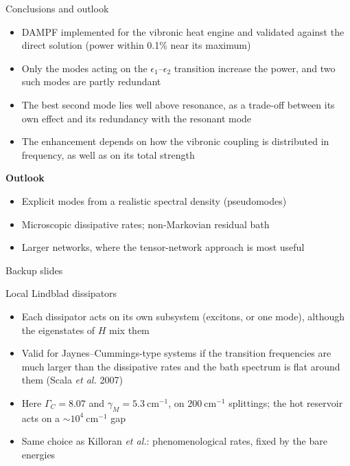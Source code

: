 \documentclass[aspectratio=169,11pt]{beamer}
\begin{document}
\begin{frame}{Conclusions and outlook}
  \begin{itemize}\setlength\itemsep{0.6em}
    \item DAMPF implemented for the vibronic heat engine and validated against the direct solution (power within 0.1\% near its maximum)
    \item Only the modes acting on the $\epsilon_1$--$\epsilon_2$ transition increase the power, and two such modes are partly redundant
    \item The best second mode lies well above resonance, as a trade-off between its own effect and its redundancy with the resonant mode
    \item The enhancement depends on how the vibronic coupling is distributed in frequency, as well as on its total strength
  \end{itemize}
  \vspace{0.6em}
  {\color{tblue}\textbf{Outlook}}
  \begin{itemize}\setlength\itemsep{0.4em}
    \item Explicit modes from a realistic spectral density (pseudomodes)
    \item Microscopic dissipative rates; non-Markovian residual bath
    \item Larger networks, where the tensor-network approach is most useful
  \end{itemize}
\end{frame}

\appendix
\begin{frame}[plain]
  \centering\vfill{\Large\color{tblue}Backup slides}\vfill
\end{frame}

\begin{frame}{Local Lindblad dissipators}
  \begin{itemize}\setlength\itemsep{0.8em}
    \item Each dissipator acts on its own subsystem (excitons, or one mode), although the eigenstates of $H$ mix them
    \item Valid for Jaynes--Cummings-type systems if the transition frequencies are much larger than the dissipative rates and the bath spectrum is flat around them (Scala \textit{et al.} 2007)
    \item Here $\Gamma_C=8.07$ and $\gamma_M=5.3~\mathrm{cm^{-1}}$, on $200~\mathrm{cm^{-1}}$ splittings; the hot reservoir acts on a $\sim10^4~\mathrm{cm^{-1}}$ gap
    \item Same choice as Killoran \textit{et al.}: phenomenological rates, fixed by the bare energies
  \end{itemize}
\end{frame}
\end{document}
